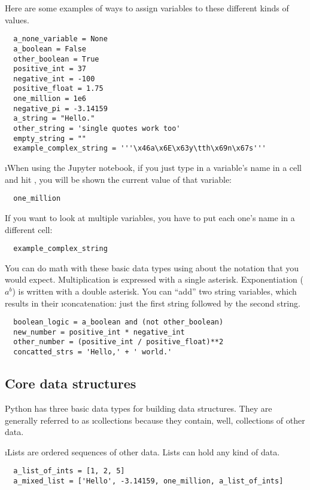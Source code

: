 \documentclass[letterpaper, 12pt, titlepage, twoside]{article}
\begin{document}
Here are some examples of ways to assign variables to these different kinds of
values.

\begin{lstlisting}
  a_none_variable = None
  a_boolean = False
  other_boolean = True
  positive_int = 37
  negative_int = -100
  positive_float = 1.75
  one_million = 1e6
  negative_pi = -3.14159
  a_string = "Hello."
  other_string = 'single quotes work too'
  empty_string = ""
  example_complex_string = '''\x46a\x6E\x63y\tth\x69n\x67s'''
\end{lstlisting}

\i{When using the Jupyter notebook}, if you just type in a variable's name in
a cell and hit , you will be shown the current value of that
variable:

\begin{lstlisting}
  one_million
\end{lstlisting}

If you want to look at multiple variables, you have to put each one's name in
a different cell:

\begin{lstlisting}
  example_complex_string
\end{lstlisting}

You can do math with these basic data types using about the notation that you
would expect. Multiplication is expressed with a single asterisk.
Exponentiation ($a^b$) is written with a double asterisk. You can ``add'' two
string variables, which results in their \i{concatenation}: just the first
string followed by the second string.

\begin{lstlisting}
  boolean_logic = a_boolean and (not other_boolean)
  new_number = positive_int * negative_int
  other_number = (positive_int / positive_float)**2
  concatted_strs = 'Hello,' + ' world.'
\end{lstlisting}

\subsection*{Core data structures}

Python has three basic data types for building data structures. They are
generally referred to as \i{collections} because they contain, well,
collections of other data.

\i{Lists} are
ordered sequences of other data. Lists can hold any kind of data.

\begin{lstlisting}
  a_list_of_ints = [1, 2, 5]
  a_mixed_list = ['Hello', -3.14159, one_million, a_list_of_ints]
\end{lstlisting}
\end{document}
